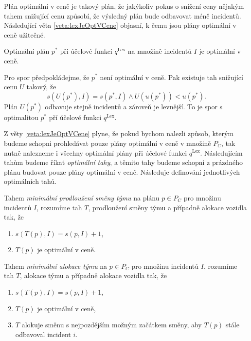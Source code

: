 Plán optimální v ceně je takový plán, že jakýkoliv pokus o snížení ceny nějakým tahem snižující cenu způsobí, že výsledný plán bude odbavovat méně incidentů.
Následující věta \ref{veta:lexJeOptVCene} objasní, k čemu jsou plány optimální v ceně užitečné.
\begin{veta}\label{veta:lexJeOptVCene}
  Optimální plán $p^*$ při účelové funkci $q^{\text{Lex}}$ na množině incidentů $I$ je optimální v ceně.
\end{veta}
\begin{dukaz}
  Pro spor předpokládejme, že $p^*$ není optimální v ceně.
  Pak existuje tah snižující cenu $U$ takový, že
  \begin{equation*}
    s(U(p^*), I) = s(p^*, I) \land U(u(p^*)) < u(p^*).
  \end{equation*}
  Plán $U(p^*)$ odbavuje stejně incidentů a zároveň je levnější.
  To je spor s optimalitou $p^*$ pří účelové funkci $q^{\text{Lex}}$.
\end{dukaz}

Z věty \ref{veta:lexJeOptVCene} plyne, že pokud bychom nalezli způsob, kterým budeme schopni prohledávat pouze plány optimální v ceně v množině $P_C$, tak nutně
nalezneme i všechny optimální plány při účelové funkci $q^{\text{Lex}}$.
Následujícím tahům budeme říkat \textit{optimální tahy}, a těmito tahy budeme schopni z prázdného plánu budovat pouze plány optimální v ceně.
Následuje definování jednotlivých optimálních tahů.

\begin{definice}
  Tahem \textit{minimální prodloužení směny týmu} na plánu $p \in P_C$ pro množinu incidentů $I$, rozumíme tah $T$, prodloužení směny týmu a případně alokace vozidla tak, že
  \begin{enumerate}
    \item
      $s(T(p), I) = s(p, I) + 1$,
    \item
      $T(p)$ je optimální v ceně.
  \end{enumerate}
\end{definice}

\begin{definice}
  Tahem \textit{minimální alokace týmu} na $p \in P_C$ pro množinu incidentů $I$, rozumíme tah $T$, alokace týmu a případně alokace vozidla tak, že
  \begin{enumerate}
    \item
      $s(T(p), I) = s(p, I) + 1$,

    \item
      $T(p)$ je optimální v ceně,


    \item
      $T$ alokuje směnu s nejpozdějším možným začátkem směny, aby $T(p)$ stále odbavoval incident $i$. 
  \end{enumerate}
\end{definice}

